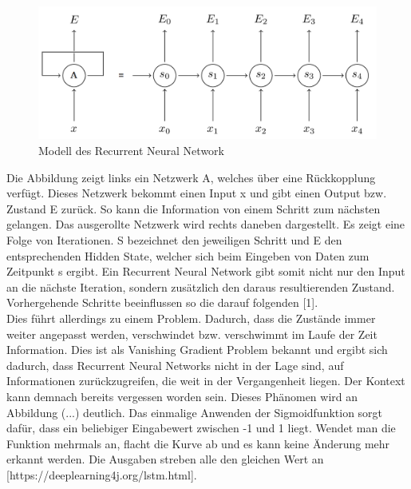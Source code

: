 \begin{figure}[h!]
	\centering
	\includegraphics[width=0.8\linewidth]{images/rnn}
	\caption{Modell des Recurrent Neural Network  \cite{GonzalezDominguez.2015}} %
	\label{fig:topology}
\end{figure}

Die Abbildung zeigt links ein Netzwerk A, welches über eine Rückkopplung verfügt. Dieses Netzwerk bekommt einen Input x und gibt einen Output bzw. Zustand E zurück. So kann die Information von einem Schritt zum nächsten gelangen. Das ausgerollte Netzwerk wird rechts daneben dargestellt. Es zeigt eine Folge von Iterationen. S bezeichnet den jeweiligen Schritt und E den entsprechenden Hidden State, welcher sich beim Eingeben von Daten zum Zeitpunkt s ergibt. Ein Recurrent Neural Network gibt somit nicht nur den Input an die nächste Iteration, sondern zusätzlich den daraus resultierenden Zustand. Vorhergehende Schritte beeinflussen so die darauf folgenden [1]. 
\\
Dies führt allerdings zu einem Problem. Dadurch, dass die Zustände immer weiter angepasst werden, verschwindet bzw. verschwimmt im Laufe der Zeit Information. Dies ist als Vanishing Gradient Problem bekannt und ergibt sich dadurch, dass Recurrent Neural Networks nicht in der Lage sind, auf Informationen zurückzugreifen, die weit in der Vergangenheit liegen. Der Kontext kann demnach bereits vergessen worden sein. Dieses Phänomen wird an Abbildung (...) deutlich. Das einmalige Anwenden der Sigmoidfunktion sorgt dafür, dass ein beliebiger Eingabewert zwischen -1 und 1 liegt. Wendet man die Funktion mehrmals an, flacht die Kurve ab und es kann keine Änderung mehr erkannt werden. Die Ausgaben streben alle den gleichen Wert an [https://deeplearning4j.org/lstm.html].

